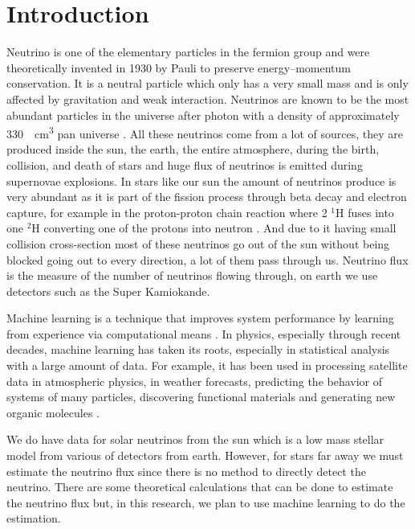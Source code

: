 \section{Introduction}

Neutrino is one of the elementary particles in the fermion group and were theoretically invented in 1930 by Pauli to preserve energy–momentum conservation. It is a neutral particle which only has a very small mass and is only affected by gravitation and weak interaction.  Neutrinos are known to be the most abundant particles in the universe after photon with a density of approximately \SI{330}{\per\centi\meter\cubed} pan universe . All these neutrinos come from a lot of sources, they are produced inside the sun, the earth, the entire atmosphere, during the birth, collision, and death of stars and huge flux of neutrinos is emitted during supernovae explosions. In stars like our sun the amount of neutrinos produce is very abundant as it is part of the fission process through beta decay and electron capture, for example in the proton-proton chain reaction where 2 ${}^{1}\mathrm H$ fuses into one ${}^{2}\mathrm H$ converting one of the protons into neutron . And due to it having small collision cross-section most of these neutrinos go out of the sun without being blocked going out to every direction, a lot of them pass through us. Neutrino flux is the measure of the number of neutrinos flowing through, on earth we use detectors such as the Super Kamiokande.

Machine learning is a technique that improves system performance by learning from experience via computational means . In physics, especially through recent decades, machine learning has taken its roots, especially in statistical analysis with a large amount of data. For example, it has been used in processing satellite data in atmospheric physics, in weather forecasts, predicting the behavior of systems of many particles, discovering functional materials and generating new organic molecules .

We do have data for solar neutrinos from the sun which is a low mass stellar model from various of detectors from earth. However, for stars far away we must estimate the neutrino flux since there is no method to directly detect the neutrino. There are some theoretical calculations that can be done to estimate the neutrino flux but, in this research, we plan to use machine learning to do the estimation.


